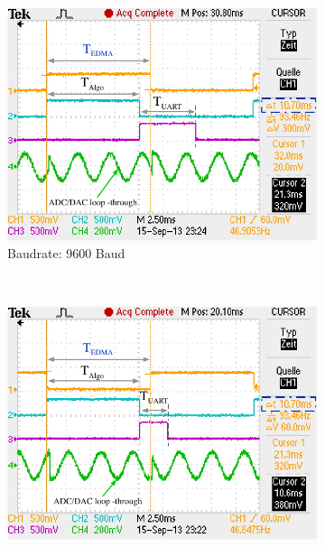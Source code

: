 \begin{figure}
        \centering
        \begin{subfigure}[b]{0.6\textwidth}
                \centering
                \includegraphics[width=\textwidth]{images/04_Echtzeitversuch/Profile_UART_9600}
                \caption{Baudrate: 9600 Baud}
                \label{fig:Profile_UART_9600}
        \end{subfigure}
        ~ %
        \begin{subfigure}[b]{0.6\textwidth}
                \centering
                \includegraphics[width=\textwidth]{images/04_Echtzeitversuch/Profile_UART_19200}

\end{subfigure}
\end{figure}
